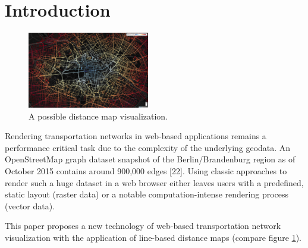 \documentclass{motivation}
\begin{document}


\section{Introduction}

  \begin{figure}[h]
    \centering
    \includegraphics[width=0.475\textwidth]{../img/distmap.png}
    \caption{A possible distance map visualization.}
    \label{fig:distmap}
  \end{figure}

  Rendering transportation networks in web-based applications remains a performance critical task due to the complexity of the underlying geodata. An OpenStreetMap graph dataset snapshot of the Berlin/Brandenburg region as of October 2015 contains around 900,000 edges [22]. Using classic approaches to render such a huge dataset in a web browser either leaves users with a predefined, static layout (raster data) or a notable computation-intense rendering process (vector data).\par
  This paper proposes a new technology of web-based transportation network visualization with the application of line-based distance maps (compare figure \ref{fig:distmap}).
\end{document}
